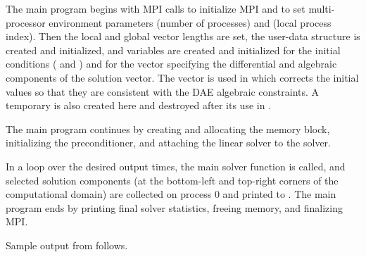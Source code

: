 The main program begins with MPI calls to initialize MPI and to set
multi-processor environment parameters  (number of processes) and
 (local process index).  Then the local and global vector lengths
are set, the user-data structure  is created and initialized, and
 variables are created and initialized for the initial conditions
( and ) and for the vector  specifying the differential 
and algebraic components of the solution vector. The  vector is used
in  which corrects the initial values so that they are
consistent with the DAE algebraic constraints.
A temporary   is also created here and destroyed after
its use in .

The main program continues by creating and allocating the {\ida} memory
block, initializing the {\idabbdpre} preconditioner, and attaching the
{\idaspgmr} linear solver to the {\ida} solver.

In a loop over the desired output times, the main solver function 
is called, and selected solution components (at the bottom-left and top-right
corners of the computational domain) are collected on process 0 and printed
to . The main program ends by printing final solver statistics,
freeing memory, and finalizing MPI.

Sample output from  follows.

